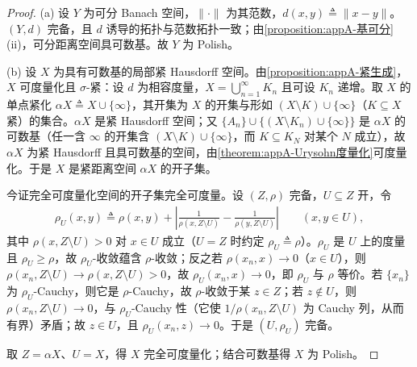 \documentclass[../main.tex]{subfiles}
\begin{document}
\begin{proof}
(a) 设 $Y$ 为可分 Banach 空间，$\|\cdot\|$ 为其范数，$d(x,y)\triangleq\|x-y\|$。$(Y,d)$ 完备，且 $d$ 诱导的拓扑与范数拓扑一致；由\cref{proposition:appA-基可分}(ii)，可分距离空间具可数基。故 $Y$ 为 Polish。

(b) 设 $X$ 为具有可数基的局部紧 Hausdorff 空间。由\cref{proposition:appA-紧生成}，$X$ 可度量化且 $\sigma$-紧：设 $d$ 为相容度量，$X=\bigcup_{n=1}^\infty K_n$ 且可设 $K_n$ 递增。取 $X$ 的单点紧化 $\alpha X\triangleq X\cup\{\infty\}$，其开集为 $X$ 的开集与形如 $(X\setminus K)\cup\{\infty\}$（$K\subseteq X$ 紧）的集合。$\alpha X$ 是紧 Hausdorff 空间；又 $\{A_n\}\cup\{(X\setminus K_n)\cup\{\infty\}\}$ 是 $\alpha X$ 的可数基（任一含 $\infty$ 的开集含 $(X\setminus K)\cup\{\infty\}$，而 $K\subseteq K_N$ 对某个 $N$ 成立），故 $\alpha X$ 为紧 Hausdorff 且具可数基的空间，由\cref{theorem:appA-Urysohn度量化}可度量化。于是 $X$ 是紧距离空间 $\alpha X$ 的开子集。

今证完全可度量化空间的开子集完全可度量。设 $(Z,\rho)$ 完备，$U\subseteq Z$ 开，令
\begin{align*}
\rho_U(x,y)\triangleq\rho(x,y)+\left|\frac{1}{\rho(x,Z\setminus U)}-\frac{1}{\rho(y,Z\setminus U)}\right|\qquad(x,y\in U),
\end{align*}
其中 $\rho(x,Z\setminus U)>0$ 对 $x\in U$ 成立（$U=Z$ 时约定 $\rho_U\triangleq\rho$）。$\rho_U$ 是 $U$ 上的度量且 $\rho_U\geqslant\rho$，故 $\rho_U$-收敛蕴含 $\rho$-收敛；反之若 $\rho(x_n,x)\to0$（$x\in U$），则 $\rho(x_n,Z\setminus U)\to\rho(x,Z\setminus U)>0$，故 $\rho_U(x_n,x)\to0$，即 $\rho_U$ 与 $\rho$ 等价。若 $\{x_n\}$ 为 $\rho_U$-Cauchy，则它是 $\rho$-Cauchy，故 $\rho$-收敛于某 $z\in Z$；若 $z\notin U$，则 $\rho(x_n,Z\setminus U)\to0$，与 $\rho_U$-Cauchy 性（它使 $1/\rho(x_n,Z\setminus U)$ 为 Cauchy 列，从而有界）矛盾；故 $z\in U$，且 $\rho_U(x_n,z)\to0$。于是 $(U,\rho_U)$ 完备。

取 $Z=\alpha X$、$U=X$，得 $X$ 完全可度量化；结合可数基得 $X$ 为 Polish。
\end{proof}
\end{document}
